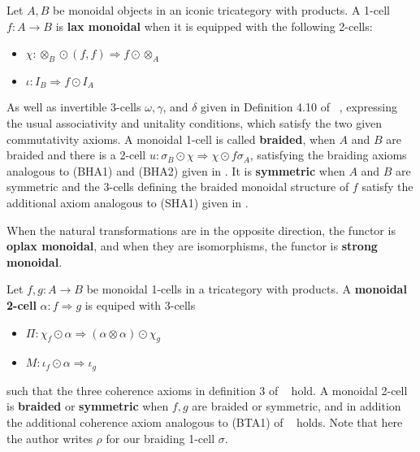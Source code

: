 \begin{defn}
Let $A,B$ be monoidal objects in an iconic tricategory  with products. A 1-cell $f:A \rightarrow B$ is {\bf lax monoidal} when it is equipped with the following 2-cells:
\begin{itemize}
\item $\chi: \otimes_B \odot (f,f) \Rightarrow f \odot \otimes_A$
\item $\iota: I_B \Rightarrow f \odot I_A$
\end{itemize}
As well as invertible 3-cells $\omega, \gamma$, and $\delta$ given in Definition 4.10 of ~\cite{nick:tricatsbook}, expressing the usual associativity and unitality conditions, which satisfy the two given commutativity axioms.
A monoidal 1-cell is called {\bf braided}, when $A$ and $B$ are braided and there is a 2-cell $u: \sigma_B \odot \chi  \Rightarrow \chi \odot f\sigma_A$, satisfying the braiding axioms analogous to (BHA1) and (BHA2) given in  \cite[p141-142]{mccrudden:bal-coalgb}. It is {\bf symmetric} when $A$ and $B$ are symmetric and the 3-cells defining the braided monoidal structure of $f$ satisfy the additional axiom analogous to  (SHA1) given in   \cite[p145]{mccrudden:bal-coalgb}.

When the natural transformations are in the opposite direction, the functor is {\bf oplax monoidal}, and when they are isomorphisms, the functor is {\bf strong monoidal}.
\end{defn}



\begin{defn}\label{Def:monverttrans}
Let $f, g:A \rightarrow B$ be monoidal 1-cells in a tricategory with products. A {\bf monoidal 2-cell} $\alpha: f \Rightarrow g$ is equiped with 3-cells
\begin{itemize}
\item $\Pi: \chi_f \odot \alpha \Rightarrow (\alpha \otimes \alpha) \odot \chi_g$
\item $M: \iota_f \odot \alpha \Rightarrow \iota_g$
\end{itemize}
such that the three coherence axioms in definition 3 of ~\cite{gg:ldstr-tricat} hold.
A monoidal 2-cell is {\bf braided} or {\bf symmetric} when $f,g$ are braided or symmetric, and in addition the additional coherence axiom analogous to (BTA1) of ~\cite[p143]{mccrudden:bal-coalgb} holds. Note that here the author writes $\rho$ for our braiding 1-cell $\sigma$.
\end{defn}



